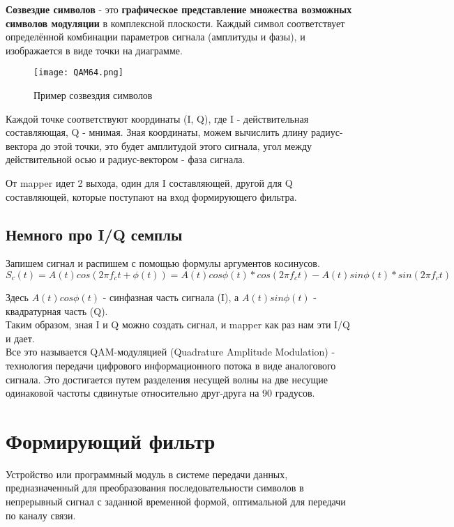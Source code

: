 \textbf{Созвездие символов} - это \textbf{графическое представление множества возможных символов модуляции} в комплексной плоскости.  
Каждый символ соответствует определённой комбинации параметров сигнала (амплитуды и фазы), и изображается в виде точки на диаграмме.  

\begin{figure}[H]
    \centering
    \texttt{[image: QAM64.png]}
    \caption{Пример созвездия символов}
\end{figure}

Каждой точке соответствуют координаты (I, Q), где I - действительная составляющая, Q - мнимая. Зная координаты, можем вычислить
длину радиус-вектора до этой точки, это будет амплитудой этого сигнала, угол между действительной осью и радиус-вектором - фаза
сигнала.

От mapper идет 2 выхода, один для I составляющей, другой для Q составляющей, которые поступают на вход формирующего фильтра.

\subsection*{Немного про I/Q семплы}

Запишем сигнал и распишем с помощью формулы аргументов косинусов. \\

$$S_c(t) = A(t)cos(2\pi f_ct + \phi(t)) = A(t)cos\phi(t)*cos(2\pi f_ct) - A(t)sin\phi(t)*sin(2\pi f_ct)$$

Здесь $A(t)cos\phi(t)$ - синфазная часть сигнала (I), а $A(t)sin\phi(t)$ - квадратурная часть (Q). \\

Таким образом, зная I и Q можно создать сигнал, и mapper как раз нам эти I/Q и дает. \\

Все это называется QAM-модуляцией (Quadrature Amplitude Modulation) - технология передачи цифрового информационного потока в виде аналогового
сигнала. Это достигается путем разделения несущей волны на две несущие одинаковой
частоты сдвинутые относительно друг-друга на 90 градусов.

\section*{Формирующий фильтр}


Устройство или программный модуль в системе передачи данных, предназначенный для преобразования последовательности символов в непрерывный сигнал с заданной временной формой, оптимальной для передачи по каналу связи.  

